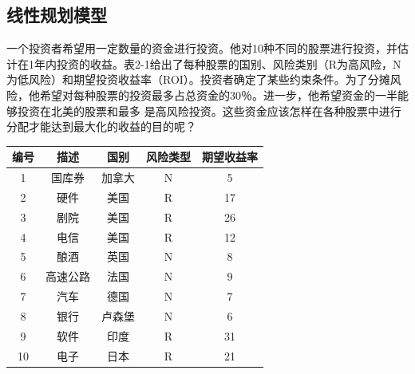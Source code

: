  \subsection{线性规划模型}
\begin{frame}{\subsecname}
 \begin{example}[2-1：投资组合问题]
 一个投资者希望用一定数量的资金进行投资。他对10种不同的股票进行投资，并估计在1年内投资的收益。表2-1给出了每种股票的国别、风险类别（R为高风险，N为低风险）和期望投资收益率（ROI）。投资者确定了某些约束条件。为了分摊风险，他希望对每种股票的投资最多占总资金的30％。进一步，他希望资金的一半能够投资在北美的股票和最多 是高风险投资。这些资金应该怎样在各种股票中进行分配才能达到最大化的收益的目的呢？
 
\begin{table}[]
\begin{tabular}{|c|c|c|c|c|}
\hline
\textbf{编号} & \textbf{描述} & \textbf{国别} & \textbf{风险类型} & \textbf{期望收益率} \\ \hline
\rowcolor[HTML]{FFFFFF} 
1           & 国库券         & 加拿大         & N             & 5              \\ \hline
\rowcolor[HTML]{FFFFFF} 
2           & 硬件          & 美国          & R             & 17             \\ \hline
\rowcolor[HTML]{FFFFFF} 
3           & 剧院          & 美国          & R             & 26             \\ \hline
\rowcolor[HTML]{FFFFFF} 
4           & 电信          & 美国          & R             & 12             \\ \hline
\rowcolor[HTML]{FFFFFF} 
5           & 酿酒          & 英国          & N             & 8              \\ \hline
\rowcolor[HTML]{FFFFFF} 
6           & 高速公路        & 法国          & N             & 9              \\ \hline
\rowcolor[HTML]{FFFFFF} 
7           & 汽车          & 德国          & N             & 7              \\ \hline
\rowcolor[HTML]{FFFFFF} 
8           & 银行          & 卢森堡         & N             & 6              \\ \hline
\rowcolor[HTML]{FFFFFF} 
9           & 软件          & 印度          & R             & 31             \\ \hline
\rowcolor[HTML]{FFFFFF} 
10          & 电子          & 日本          & R             & 21             \\ \hline
\end{tabular}
\end{table}
 \end{example}   
\end{frame}

